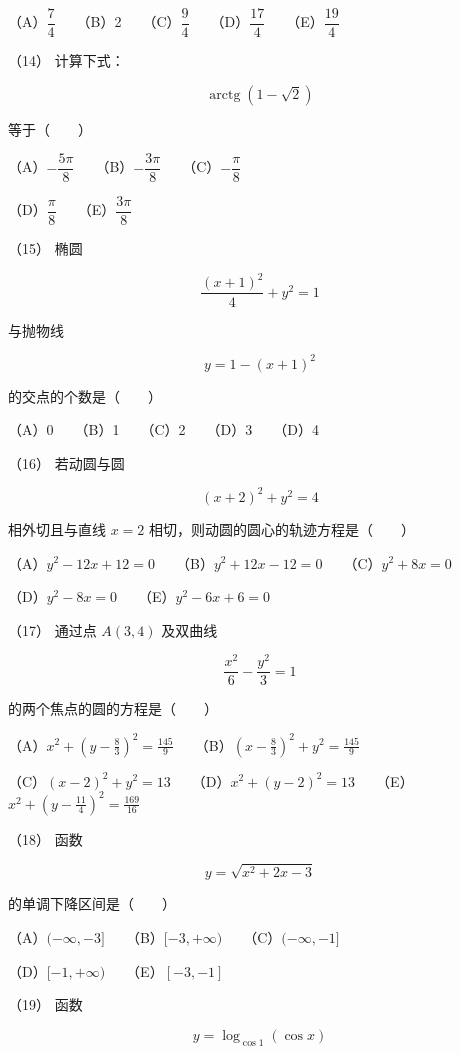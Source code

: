 \begin{question}
（A）$\dfrac74$　　（B）2　　（C）$\dfrac94$　　（D）$\dfrac{17}4$　　（E）$\dfrac{19}4$

（14） 计算下式：

\nopagebreak[4]
\[
\operatorname{arctg}(1-\sqrt2)
\]

等于\mbox{（　　）}

（A）$-\dfrac{5\pi}8$　　（B）$-\dfrac{3\pi}8$　　（C）$-\dfrac\pi8$

（D）$\dfrac\pi8$　　（E）$\dfrac{3\pi}8$

（15） 椭圆

\nopagebreak[4]
\[
\frac{(x+1)^2}{4}+y^2=1
\]

与抛物线

\nopagebreak[4]
\[
y=1-(x+1)^2
\]

的交点的个数是\mbox{（　　）}

（A）0　　（B）1　　（C）2　　（D）3　　（D）4

（16） 若动圆与圆

\nopagebreak[4]
\[
(x+2)^2+y^2=4
\]

相外切且与直线 $x=2$ 相切，则动圆的圆心的轨迹方程是\mbox{（　　）}

（A）$y^2-12x+12=0$　　（B）$y^2+12x-12=0$　　（C）$y^2+8x=0$

（D）$y^2-8x=0$　　（E）$y^2-6x+6=0$

（17） 通过点 $A(3,4)$ 及双曲线

\nopagebreak[4]
\[
\frac{x^2}{6}-\frac{y^2}{3}=1
\]

的两个焦点的圆的方程是\mbox{（　　）}

（A）$x^2+(y-\frac83)^2=\frac{145}{9}$　　（B）$(x-\frac83)^2+y^2=\frac{145}{9}$

（C）$(x-2)^2+y^2=13$　　（D）$x^2+(y-2)^2=13$　　（E）$x^2+(y-\frac{11}4)^2=\frac{169}{16}$

（18） 函数

\nopagebreak[4]
\[
y=\sqrt{x^2+2x-3}
\]

的单调下降区间是\mbox{（　　）}

（A）$(-\infty,-3]$　　（B）$[-3,+\infty)$　　（C）$(-\infty,-1]$

（D）$[-1,+\infty)$　　（E）$[-3,-1]$

（19） 函数

\nopagebreak[4]
\[
y=\log_{\cos1}(\cos x)
\]


\end{question}
